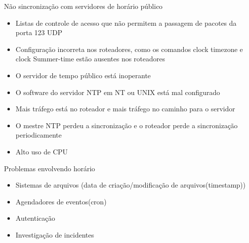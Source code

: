 \documentclass{if-beamer}
\begin{document}
	\begin{frame}{Não sincronização com servidores de horário público}
		\begin{itemize}
		  \item Listas de controle de acesso que não permitem a passagem de pacotes da porta 123 UDP
		\item Configuração incorreta nos roteadores, como os comandos clock timezone e clock Summer-time estão ausentes nos roteadores
		\item O servidor de tempo público está inoperante
		\item O software do servidor NTP em NT ou UNIX está mal configurado
		\item Mais tráfego está no roteador e mais tráfego no caminho para o servidor
		\item O mestre NTP perdeu a sincronização e o roteador perde a sincronização periodicamente
		\item Alto uso de CPU
				\end{itemize}
		
	\end{frame}
	\begin{frame}{Problemas envolvendo horário}
				
		\begin{block}{}
			\begin{itemize}
			\item Sistemas de arquivos (data de criação/modificação de arquivos(timestamp))
			\item Agendadores de eventos(cron)
			\item Autenticação
			\item Investigação de incidentes
			\end{itemize}
		\end{block}
	\end{frame}
	
\end{document}
